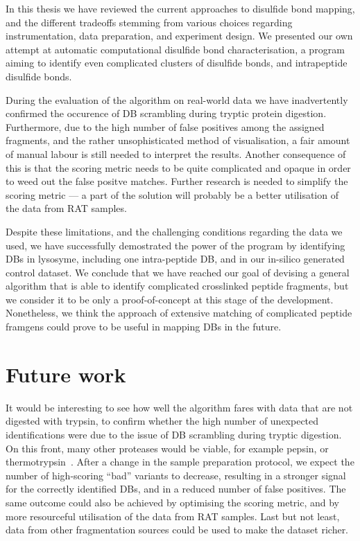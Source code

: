 
In this thesis we have reviewed the current approaches to disulfide bond mapping, and the different tradeoffs stemming from various choices regarding instrumentation, data preparation, and experiment design. We presented our own attempt at automatic computational disulfide bond characterisation, a program aiming to identify even complicated clusters of disulfide bonds, and intrapeptide disulfide bonds.

During the evaluation of the algorithm on real-world data we have inadvertently confirmed the occurence of DB scrambling during tryptic protein digestion. Furthermore, due to the high number of false positives among the assigned fragments, and the rather unsophisticated method of visualisation, a fair amount of manual labour is still needed to interpret the results. Another consequence of this is that the scoring metric needs to be quite complicated and opaque in order to weed out the false positve matches. Further research is needed to simplify the scoring metric --- a part of the solution will probably be a better utilisation of the data from RAT samples.

Despite these limitations, and the challenging conditions regarding the data we used, we have successfully demostrated the power of the program by identifying DBs in lysosyme, including one intra-peptide DB, and in our in-silico generated control dataset. We conclude that we have reached our goal of devising a general algorithm that is able to identify complicated crosslinked peptide fragments, but we consider it to be only a proof-of-concept at this stage of the development. Nonetheless, we think the approach of extensive matching of complicated peptide framgens could prove to be useful in mapping DBs in the future.

\section*{Future work}

It would be interesting to see how well the algorithm fares with data that are not digested with trypsin, to confirm whether the high number of unexpected identifications were due to the issue of DB scrambling during tryptic digestion. On this front, many other proteases would be viable, for example pepsin, or thermotrypsin~\cite{sung2016evaluation}. After a change in the sample preparation protocol, we expect the number of high-scoring ``bad'' variants to decrease, resulting in a stronger signal for the correctly identified DBs, and in a reduced number of false positives. The same outcome could also be achieved by optimising the scoring metric, and by more resourceful utilisation of the data from RAT samples. Last but not least, data from other fragmentation sources could be used to make the dataset richer.

